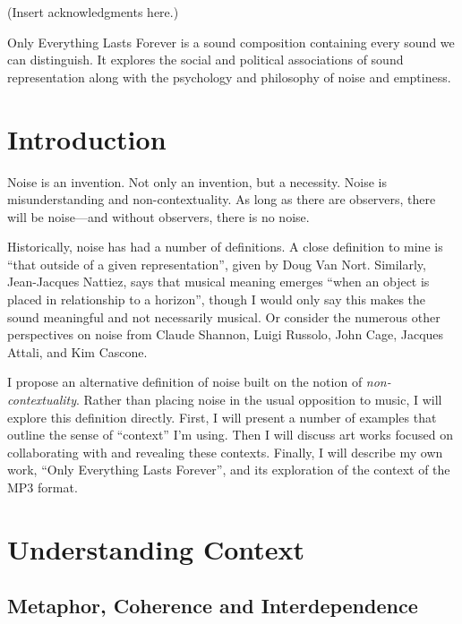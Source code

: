 \documentclass{thesis}
\author{Kyle McDonald}
\begin{document}
 
\titlepage
\tableofcontents


(Insert acknowledgments here.)


Only Everything Lasts Forever is a sound composition containing every sound we can distinguish. It explores the social and political associations of sound representation along with the psychology and philosophy of noise and emptiness.

\chapter{Introduction}

Noise is an invention. Not only an invention, but a necessity. Noise is misunderstanding and non-contextuality. As long as there are observers, there will be noise---and without observers, there is no noise.

Historically, noise has had a number of definitions. A close definition to mine is ``that outside of a given representation'', given by Doug Van Nort\cite{Vannort06}. Similarly, Jean-Jacques Nattiez\cite{nattiez_music_1990}, says that musical meaning emerges ``when an object is placed in relationship to a horizon'', though I would only say this makes the sound meaningful and not necessarily musical. Or consider the numerous other perspectives on noise from Claude Shannon, Luigi Russolo\cite{Russolo04}, John Cage\cite{Cage61}, Jacques Attali\cite{Attali85}, and Kim Cascone\cite{Cascone00}.

I propose an alternative definition of noise built on the notion of \emph{non-contextuality}. Rather than placing noise in the usual opposition to music, I will explore this definition directly. First, I will present a number of examples that outline the sense of ``context'' I'm using. Then I will discuss art works focused on collaborating with and revealing these contexts. Finally, I will describe my own work, ``Only Everything Lasts Forever'', and its exploration of the context of the MP3 format.

\chapter{Understanding Context}

\section{Metaphor, Coherence and Interdependence}
\end{document}
